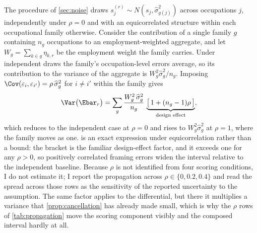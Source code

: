 The procedure of \cref{sec:noise} draws $s^{(r)}_j \sim N(s_j, \widehat{\sigma}^2_{g(j)})$ across occupations $j$, independently under $\rho = 0$ and with an equicorrelated structure within each occupational family otherwise. Consider the contribution of a single family $g$ containing $n_g$ occupations to an employment-weighted aggregate, and let $W_g = \sum_{k \in g} \eta_{k,r}$ be the employment weight the family carries. Under independent draws the family's occupation-level errors average, so its contribution to the variance of the aggregate is $W_g^2 \widehat{\sigma}^2_g / n_g$. Imposing $\Cov(\varepsilon_i, \varepsilon_{i'}) = \rho\,\widehat{\sigma}^2_g$ for $i \ne i'$ within the family gives
\begin{equation}\label{eq:A11}
\Var\bigl(\Ebar_r\bigr)
= \sum_g \frac{W_g^2\, \widehat{\sigma}^2_g}{n_g}
\, \underbrace{\bigl[\, 1 + (n_g - 1)\rho \,\bigr]}_{\text{design effect}} ,
\end{equation}
which reduces to the independent case at $\rho = 0$ and rises to $W_g^2 \widehat{\sigma}^2_g$ at $\rho = 1$, where the family moves as one.  is an exact expression under equicorrelation rather than a bound: the bracket is the familiar design-effect factor, and it exceeds one for any $\rho > 0$, so positively correlated framing errors widen the interval relative to the independent baseline. Because $\rho$ is not identified from four scoring conditions, I do not estimate it; I report the propagation across $\rho \in \{0, 0.2, 0.4\}$ and read the spread across those rows as the sensitivity of the reported uncertainty to the assumption. The same factor applies to the differential, but there it multiplies a variance that \cref{prop:cancellation} has already made small, which is why the $\rho$ rows of \cref{tab:propagation} move the scoring component visibly and the composed interval hardly at all.